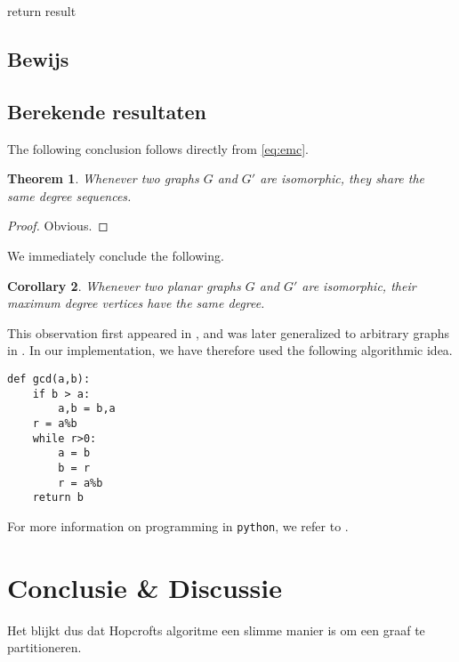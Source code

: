 \documentclass[twoside]{article}
\newtheorem{theorem}{Theorem}[section]
\newtheorem{corollary}[theorem]{Corollary}
\begin{document}
\begin{multicols}{2}
\begin{algorithm}[H]
return result
 

\caption{$ generate\_dcount $}
\end{algorithm}




\subsection{Bewijs}

\subsection{Berekende resultaten}

The following conclusion follows directly from \eqref{eq:emc}.
\lipsum[6] %
\begin{theorem}
Whenever two graphs $G$ and $G'$ are isomorphic, they share the same degree sequences.
\end{theorem}
\begin{proof}
Obvious.
\end{proof}
We immediately conclude the following.
\begin{corollary}
Whenever two planar graphs $G$ and $G'$ are isomorphic, their maximum degree vertices have the same degree. 
\end{corollary}
This observation first appeared in , and was later generalized to arbitrary graphs in .
In our implementation, we have therefore used the following algorithmic idea.
\begin{verbatim}
def gcd(a,b):
    if b > a:
        a,b = b,a
    r = a%b
    while r>0:
        a = b
        b = r
        r = a%b
    return b
\end{verbatim}
For more information on programming in {\tt python}, we refer to\cite{jaco} \cite{MR0403320}.

\section{Conclusie \& Discussie}
Het blijkt dus dat Hopcrofts algoritme een slimme manier is om een graaf te partitioneren. 

\lipsum[8] %


 




\end{multicols}
\end{document}
